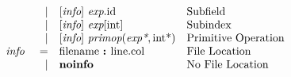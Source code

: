 \documentclass[12pt]{article}
\begin{document}
{\[\begin{array}{rrll}
                &\vert &[\text{\em info}]\  \text{\em exp}.\text{id }                                                           &\text{Subfield}\\
                &\vert &[\text{\em info}]\  \text{\em exp}[\text{int}]                                                        &\text{Subindex}\\
                &\vert &[\text{\em info}]\  \text{\em primop}(\text{\em exp*}, \text{int}\text{*})                                 &\text{Primitive Operation}\\
\text{\em info\ }       &=     &\text{filename } \text{\bf :\ } \text{line} . \text{col}                              &\text{File Location}\\
                &\vert &\text{\bf noinfo\ }                                                                   &\text{No File Location}\\
\end{array}
\]
}
\end{document}
